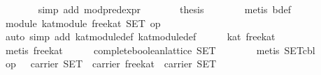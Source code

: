 \begin{isabellebody}
\ \ \ \ \ \ \isamarkupfalse%
\ {}simp\ add{}\ mod{}pred{}expr{}\isanewline
\ \ \ \ \isamarkupfalse%
\ \isamarkupfalse%
\ {}thesis\isanewline
\ \ \ \ \ \ \isamarkupfalse%
\ {}metis\ b{}def{}\isanewline
\ \ \isamarkupfalse%
%
\endisatagproof
{\isafoldproof}%
%
\isadelimproof
\isanewline
%
\endisadelimproof
\isanewline
\ \ \isamarkupfalse%
\ module{}\ {}kat{}module\ free{}kat\ SET\ {}op\ {}{}{}\isanewline
%
\isadelimproof
\ \ %
\endisadelimproof
%
\isatagproof
{}\isamarkupfalse%
\ {}auto\ simp\ add{}\ kat{}module{}def\ kat{}module{}{}def{}\isanewline
\ \ \ \ \isamarkupfalse%
\ {}kat\ free{}kat{}\isanewline
\ \ \ \ \ \ \isamarkupfalse%
\ {}metis\ free{}kat{}\isanewline
\isanewline
\ \ \ \ \isamarkupfalse%
\ {}complete{}boolean{}lattice\ SET{}\isanewline
\ \ \ \ \ \ \isamarkupfalse%
\ {}metis\ SET{}cbl{}\isanewline
\isanewline
\ \ \ \ \isamarkupfalse%
\ {}{}op\ {}{}\ {}\ carrier\ SET\ {}\ carrier\ free{}kat\ {}\ carrier\ SET{}\isanewline

\end{isabellebody}
